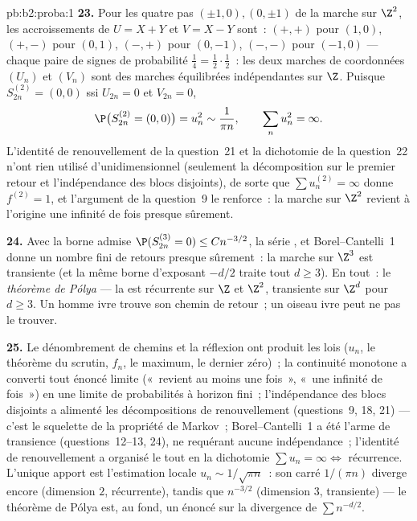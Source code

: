 \begin{solution}{pb:b2:proba:1}
\textbf{23.} Pour les quatre pas $(\pm1, 0), (0, \pm1)$ de la
marche sur $\Z^2$, les accroissements de $U = X + Y$ et $V = X - Y$
sont~: $(+,+)$ pour $(1,0)$, $(+,-)$ pour $(0,1)$, $(-,+)$ pour
$(0,-1)$, $(-,-)$ pour $(-1,0)$ --- chaque paire de signes de
probabilité $\frac14 = \frac12\cdot\frac12$~: les deux
marches de coordonnées $(U_n)$ et $(V_n)$ sont des marches
équilibrées indépendantes sur $\Z$. Puisque $S^{(2)}_{2n} = (0,0)$ ssi $U_{2n} = 0$
et $V_{2n} = 0$,
\[
\P\bigl(S^{(2)}_{2n} = (0,0)\bigr) = u_n^2 \sim \frac1{\pi
n}, \qquad \sum_nu_n^2 = \infty .
\]
L'identité de renouvellement de la question~21 et la dichotomie de
la question~22 n'ont rien utilisé d'unidimensionnel (seulement la
décomposition sur le premier retour et l'indépendance des blocs
disjoints), de sorte que $\sum u_n^{(2)} = \infty$ donne $f^{(2)} =
1$, et l'argument de la question~9 le renforce~: la marche sur
$\Z^2$ revient à l'origine une infinité de fois presque sûrement.

\textbf{24.} Avec la borne admise $\P(S^{(3)}_{2n} = 0)
\leq Cn^{-3/2}$, la série , et Borel--Cantelli~1
donne un nombre fini de retours presque sûrement~: la marche sur
$\Z^3$ est transiente (et la même borne d'exposant $-d/2$
traite tout $d \geq 3$). En tout~: le \emph{théorème de Pólya}
--- la  est récurrente sur $\Z$ et
$\Z^2$, transiente sur $\Z^d$ pour $d \geq 3$. Un homme ivre trouve
son chemin de retour~; un oiseau ivre peut ne pas le trouver.

\textbf{25.} Le dénombrement de chemins et la réflexion ont produit les lois
 ($u_n$, le théorème du scrutin, $f_n$, le maximum, le dernier
zéro)~; la continuité monotone a converti tout énoncé
limite («~revient au moins une fois~», «~une infinité de fois~»)
en une limite de probabilités à horizon fini~;
l'indépendance des blocs disjoints a alimenté les décompositions de
renouvellement (questions~9, 18, 21) --- c'est le squelette
 de la propriété de Markov~; Borel--Cantelli~1 a été l'arme
de transience (questions~12--13, 24), ne requérant aucune
indépendance~; l'identité de renouvellement a organisé le tout en
la dichotomie $\sum u_n = \infty \iff$ récurrence. L'unique
apport  est l'estimation locale $u_n \sim 1/\sqrt{\pi
n}$~: son carré $1/(\pi n)$ diverge encore (dimension $2$,
récurrente), tandis que $n^{-3/2}$  (dimension $3$,
transiente) --- le théorème de Pólya est, au fond, un énoncé
sur la divergence de $\sum n^{-d/2}$.
\end{solution}
